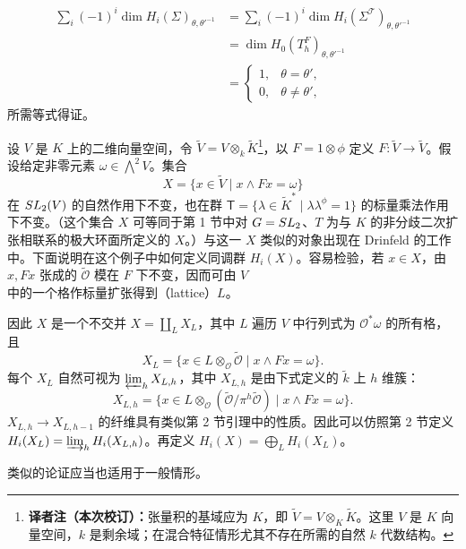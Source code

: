 \[
\begin{aligned}
\sum_i(-1)^i\dim H_i(\Sigma)_{\theta,\theta'^{-1}}
&=\sum_i(-1)^i\dim H_i(\Sigma^{\mathscr T})_{\theta,\theta'^{-1}}\\
&=\dim H_0(T_h^F)_{\theta,\theta'^{-1}}\\
&=\begin{cases}1,&\theta=\theta',\\0,&\theta\ne\theta',\end{cases}
\end{aligned}
\]
所需等式得证。

设 $V$ 是 $K$ 上的二维向量空间，令 $\widetilde V=V\otimes_k\widetilde K$\footnote{\textbf{译者注（本次校订）：}张量积的基域应为 $K$，即 $\widetilde V=V\otimes_K\widetilde K$。这里 $V$ 是 $K$ 向量空间，$k$ 是剩余域；在混合特征情形尤其不存在所需的自然 $k$ 代数结构。}，以 $F=1\otimes\phi$ 定义 $F:\widetilde V\to\widetilde V$。假设给定非零元素 $\omega\in\bigwedge^2V$。集合
\[
X=\{x\in\widetilde V\mid x\wedge Fx=\omega\}
\]
在 $SL_2(V)$ 的自然作用下不变，也在群 $\mathsf T=\{\lambda\in\widetilde K^*\mid\lambda\lambda^\phi=1\}$ 的标量乘法作用下不变。（这个集合 $X$ 可等同于第 1 节中对 $G=SL_2$、$T$ 为与 $K$ 的非分歧二次扩张相联系的极大环面所定义的 $X$。）与这一 $X$ 类似的对象出现在 Drinfeld 的工作中。下面说明在这个例子中如何定义同调群 $H_i(X)$。容易检验，若 $x\in X$，由 $x,Fx$ 张成的 $\widetilde{\mathcal O}$ 模在 $F$ 下不变，因而可由 $V$ 中的一个格作标量扩张得到（lattice）$L$。

因此 $X$ 是一个不交并 $X=\coprod_LX_L$，其中 $L$ 遍历 $V$ 中行列式为 $\mathcal O^*\omega$ 的所有格，且
\[
X_L=\{x\in L\otimes_{\mathcal O}\widetilde{\mathcal O}\mid x\wedge Fx=\omega\}.
\]
每个 $X_L$ 自然可视为 $\varprojlim_hX_{L,h}$，其中 $X_{L,h}$ 是由下式定义的 $\widetilde k$ 上 $h$ 维簇：
\[
X_{L,h}=\{x\in L\otimes_{\mathcal O}(\widetilde{\mathcal O}/\pi^h\widetilde{\mathcal O})\mid x\wedge Fx=\omega\}.
\]
$X_{L,h}\to X_{L,h-1}$ 的纤维具有类似第 2 节引理中的性质。因此可以仿照第 2 节定义 $H_i(X_L)=\varinjlim_hH_i(X_{L,h})$。再定义 $H_i(X)=\bigoplus_LH_i(X_L)$。

类似的论证应当也适用于一般情形。

